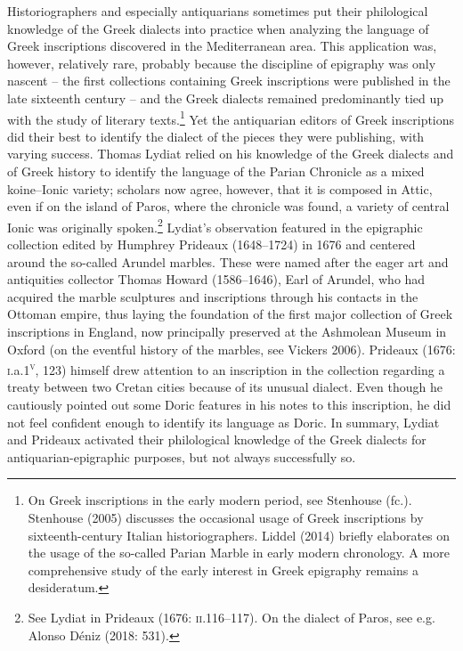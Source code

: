 \begin{styleStandard}
Historiographers and especially antiquarians sometimes put their philological knowledge of the Greek dialects into practice when analyzing the language of Greek inscriptions discovered in the Mediterranean area. This application was, however, relatively rare, probably because the discipline of epigraphy was only nascent – the first collections containing Greek inscriptions were published in the late sixteenth century – and the Greek dialects remained predominantly tied up with the study of literary texts.\footnote{ On Greek inscriptions in the early modern period, see Stenhouse (fc.). Stenhouse (2005) discusses the occasional usage of Greek inscriptions by sixteenth-century Italian historiographers. Liddel (2014) briefly elaborates on the usage of the so-called Parian Marble in early modern chronology. A more comprehensive study of the early interest in Greek epigraphy remains a desideratum.} Yet the antiquarian editors of Greek inscriptions did their best to identify the dialect of the pieces they were publishing, with varying success. Thomas Lydiat relied on his knowledge of the Greek dialects and of Greek history to identify the language of the Parian Chronicle as a mixed koine–Ionic variety; scholars now agree, however, that it is composed in Attic, even if on the island of Paros, where the chronicle was found, a variety of central Ionic was originally spoken.\footnote{ See Lydiat in Prideaux (1676: \textsc{ii}.116–117). On the dialect of Paros, see e.g. Alonso Déniz (2018: 531).} Lydiat’s observation featured in the epigraphic collection edited by Humphrey Prideaux (1648–1724) in 1676 and centered around the so-called Arundel marbles. These were named after the eager art and antiquities collector Thomas Howard (1586–1646), Earl of Arundel, who had acquired the marble sculptures and inscriptions through his contacts in the Ottoman empire, thus laying the foundation of the first major collection of Greek inscriptions in England, now principally preserved at the Ashmolean Museum in Oxford (on the eventful history of the marbles, see Vickers 2006). Prideaux (1676: \textsc{i.}a.1\textsc{\textsuperscript{v}}, 123) himself drew attention to an inscription in the collection regarding a treaty between two Cretan cities because of its unusual dialect. Even though he cautiously pointed out some Doric features in his notes to this inscription, he did not feel confident enough to identify its language as Doric. In summary, Lydiat and Prideaux activated their philological knowledge of the Greek dialects for antiquarian-epigraphic purposes, but not always successfully so.
\end{styleStandard}

